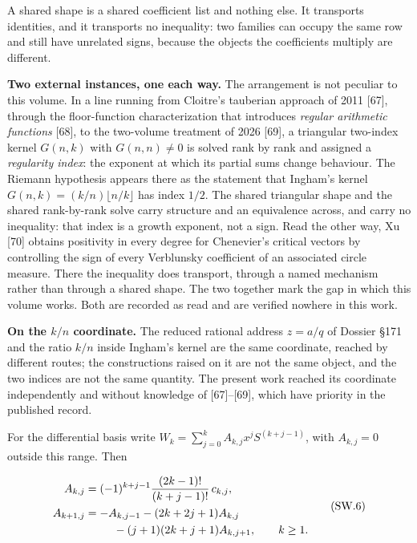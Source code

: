 \documentclass[
  11pt,
]{book}
\begin{document}
A shared shape is a shared coefficient list and nothing else. It
transports identities, and it transports no inequality: two families can
occupy the same row and still have unrelated signs, because the objects
the coefficients multiply are different.

\textbf{Two external instances, one each way.} The arrangement is not
peculiar to this volume. In a line running from Cloitre's tauberian
approach of 2011 {[}67{]}, through the floor-function characterization
that introduces \emph{regular arithmetic functions} {[}68{]}, to the
two-volume treatment of 2026 {[}69{]}, a triangular two-index kernel
\(G(n,k)\) with \(G(n,n)\ne0\) is solved rank by rank and assigned a
\emph{regularity index}: the exponent at which its partial sums change
behaviour. The Riemann hypothesis appears there as the statement that
Ingham's kernel \(G(n,k)=(k/n)\lfloor n/k\rfloor\) has index \(1/2\).
The shared triangular shape and the shared rank-by-rank solve carry
structure and an equivalence across, and carry no inequality: that index
is a growth exponent, not a sign. Read the other way, Xu {[}70{]}
obtains positivity in every degree for Chenevier's critical vectors by
controlling the sign of every Verblunsky coefficient of an associated
circle measure. There the inequality does transport, through a named
mechanism rather than through a shared shape. The two together mark the
gap in which this volume works. Both are recorded as read and are
verified nowhere in this work.

\textbf{On the \(k/n\) coordinate.} The reduced rational address
\(z=a/q\) of Dossier §171 and the ratio \(k/n\) inside Ingham's kernel
are the same coordinate, reached by different routes; the constructions
raised on it are not the same object, and the two indices are not the
same quantity. The present work reached its coordinate independently and
without knowledge of {[}67{]}--{[}69{]}, which have priority in the
published record.

For the differential basis write \(W_k=\sum_{j=0}^k
A_{k,j}x^jS^{(k+j-1)}\), with \(A_{k,j}=0\) outside this range. Then

\[
\begin{aligned}
A_{k,j}&=(-1)^{k+j-1}\frac{(2k-1)!}{(k+j-1)!}\,c_{k,j},\\
A_{k+1,j}&=-A_{k,j-1}-(2k+2j+1)A_{k,j}\\
&\hspace{9mm}-(j+1)(2k+j+1)A_{k,j+1},\qquad k\ge1.
\end{aligned}
\tag{SW.6}
\]
\end{document}
